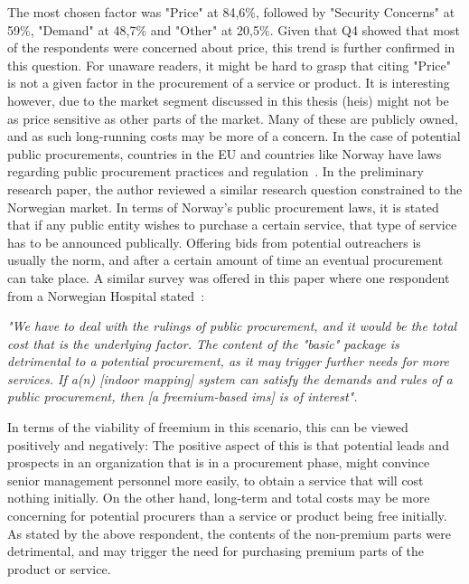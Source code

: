 The most chosen factor was "Price" at 84,6\%, followed by "Security Concerns" at 59\%, "Demand" at 48,7\% and "Other" at 20,5\%. Given that Q4 showed that most of the respondents were concerned about price, this trend is further confirmed in this question. For unaware readers, it might be hard to grasp that citing "Price" is not a given factor in the procurement of a service or product. It is interesting however, due to the market segment discussed in this thesis (\glspl{hei}) might not be as price sensitive as other parts of the market. Many of these are publicly owned, and as such long-running costs may be more of a concern. In the case of potential public procurements, countries in the EU and countries like Norway have laws regarding public procurement practices and regulation~\cite{europeancommision}\cite{procurement}. In the preliminary research paper, the author reviewed a similar research question constrained to the Norwegian market. In terms of Norway's public procurement laws, it is stated that if any public entity wishes to purchase a certain service, that type of service has to be announced publically. Offering bids from potential outreachers is usually the norm, and after a certain amount of time an eventual procurement can take place. A similar survey was offered in this paper where one respondent from a Norwegian Hospital stated~\cite{kristiantagesen2015}:
\begin{displayquote}
\textit{"We have to deal with the rulings of public procurement, and it would be the total cost that is the underlying factor. The content of the "basic" package is detrimental to a potential procurement, as it may trigger further needs for more services. If a(n) [indoor mapping] system can satisfy the demands and rules of a public procurement, then [a freemium-based \gls{ims}] is of interest".}
\end{displayquote}
In terms of the viability of freemium in this scenario, this can be viewed positively and negatively: The positive aspect of this is that potential leads and prospects in an organization that is in a procurement phase, might convince senior management personnel more easily, to obtain a service that will cost nothing initially. On the other hand, long-term and total costs may be more concerning for potential procurers than a service or product being free initially. As stated by the above respondent, the contents of the non-premium parts were detrimental, and may trigger the need for purchasing premium parts of the product or service.